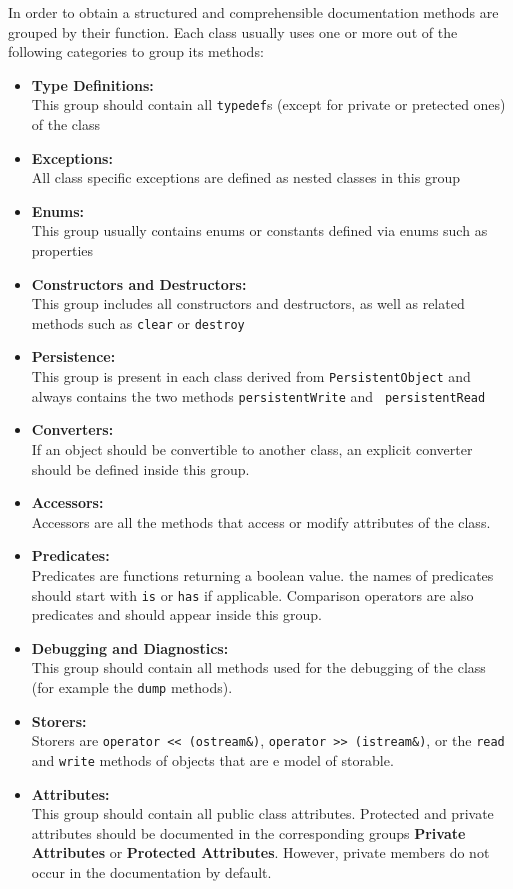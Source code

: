 \documentclass[a4]{article}
\begin{document}
In order to obtain a structured and comprehensible documentation methods are
grouped by their function. Each class usually uses one or more out of the
following categories to group its methods:
\begin{itemize}
	\item {\bf Type Definitions:}\\
		This group should contain all {\tt typedef}s (except for private or pretected
		ones) of the class
	\item {\bf Exceptions:}\\
		All class specific exceptions are defined as nested classes in this group
	\item {\bf Enums:}\\
		This group usually contains enums or constants defined via enums such as
		properties
	\item {\bf Constructors and Destructors:}\\
		This group includes all constructors and destructors, as well as related
		methods such as {\tt clear} or {\tt destroy}
	\item {\bf Persistence:}\\
		This group is present in each class derived from {\tt PersistentObject}
		and always contains the two methods {\tt persistentWrite} and {\tt
		persistentRead}
	\item {\bf Converters:}\\
		If an object should be convertible to another class, an explicit
		converter should be defined inside this group.
	\item {\bf Accessors:}\\
		Accessors are all the methods that access or modify attributes of the
		class.
	\item {\bf Predicates:}\\
		Predicates are functions returning a boolean value. the names of
		predicates should start with {\tt is} or {\tt has} if applicable.
		Comparison operators are also predicates and should appear inside
		this group.
	\item {\bf Debugging and Diagnostics:}\\
		This group should contain all methods used for the debugging of the class
		(for example the {\tt dump} methods).
	\item {\bf Storers:}\\
		Storers are {\tt operator << (ostream\&)}, {\tt operator >> (istream\&)},
		or the {\tt read} and {\tt write} methods of objects that are e model of
		storable.
	\item {\bf Attributes:}\\	
		This group should contain all public class attributes. Protected and
		private attributes should be documented in the corresponding groups
		{\bf Private Attributes} or {\bf Protected Attributes}. However, private 
		members do not occur in the documentation by default.
\end{itemize}
\end{document}

